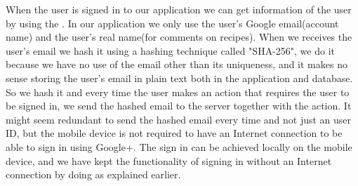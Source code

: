 When the user is signed in to our application we can get information of the user by using the .
In our application we only use the user's Google email(account name) and the user's real name(for comments on recipes). 
When we receives the user's email we hash it using a hashing technique called "SHA-256", we do it because we have no use of the email other than its uniqueness, and it makes no sense storing the user's email in plain text both in the application and database. 
So we hash it and every time the user makes an action that requires the user to be signed in, we send the hashed email to the server together with the action. 
It might seem redundant to send the hashed email every time and not just an user ID, but the mobile device is not required to have an Internet connection to be able to sign in using Google+. 
The sign in can be achieved locally on the mobile device, and we have kept the functionality of signing in without an Internet connection by doing as explained earlier.



